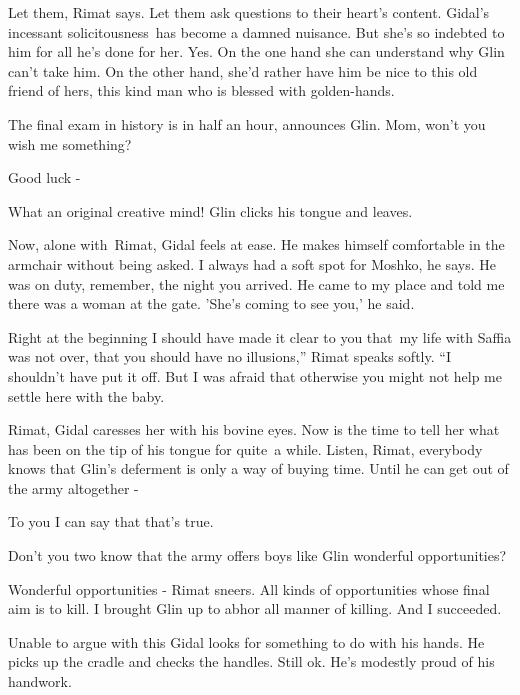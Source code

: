 \documentclass[letterpaper]{article}
\begin{document}
{\textquotedbl}Let them,{\textquotedbl} Rimat says. {\textquotedbl}Let them ask questions to their heart's
content.{\textquotedbl} Gidal's incessant solicitousness~has become a damned nuisance. But she's so indebted to him for
all he's done for her. Yes. On the one hand she can understand why Glin can't take him. On the other hand, she'd rather
have him be nice to this old friend of hers, this kind man who is blessed with golden-hands.

{\textquotedbl}The final exam in history is in half an hour,{\textquotedbl} announces Glin. {\textquotedbl}Mom, won't
you wish me something?{\textquotedbl} 

{\textquotedbl}Good luck -{\textquotedbl} 

{\textquotedbl}What an original creative mind!{\textquotedbl} Glin clicks his tongue and leaves.

Now, alone with~Rimat, Gidal feels at ease. He makes himself comfortable in the armchair without being asked.
{\textquotedbl}I always had a soft spot for Moshko,{\textquotedbl} he says. {\textquotedbl}He was on duty, remember,
the night you arrived. He came to my place and told me there was a woman at the gate. 'She's coming to see you,{}' he
said.{\textquotedbl} 

{\textquotedbl}Right at the beginning I should have made it clear to you that~my life with Saffia was not over, that you
should have no illusions,'' Rimat speaks softly. ``I shouldn't have put it off. But I was afraid that otherwise you
might not help me settle here with the baby.{\textquotedbl} 

{\textquotedbl}Rimat,{\textquotedbl} Gidal caresses her with his bovine eyes. Now is the time to tell her what has been
on the tip of his tongue for quite\textcolor{red}{\ }a while. {\textquotedbl}Listen, Rimat, everybody knows that Glin's
deferment is only a way of buying time. Until he can get out of the army altogether -{\textquotedbl} 

{\textquotedbl}To you I can say that that's true.{\textquotedbl} 

{\textquotedbl}Don't you two know that the army offers boys like Glin wonderful opportunities?{\textquotedbl} 

{\textquotedbl}Wonderful opportunities -{\textquotedbl} Rimat sneers. {\textquotedbl}All kinds of opportunities whose
final aim is to kill. I brought Glin up to abhor all manner of killing. And I succeeded.{\textquotedbl}

Unable to argue with this Gidal looks for something to do with his hands. He picks up the cradle and checks the handles.
Still ok. He's modestly proud of his handwork. 
\end{document}
